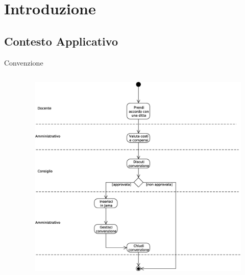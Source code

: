 \section{Introduzione}
\subsection{Contesto Applicativo}
\begin{frame}{Convenzione}
  \begin{columns}[t]
    \begin{column}{0.45\textwidth}
      \end{column}
     \begin{column}{0.55\textwidth}
      \begin{figure}[h]
	\centering
	\includegraphics[scale=0.2]{images/convenzione_activity_diag.eps}
      \end{figure}
     \end{column}
\end{columns}
 
\end{frame}

